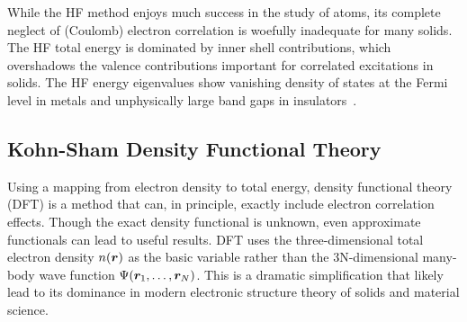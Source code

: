 While the HF method enjoys much success in the study of atoms, its complete neglect of (Coulomb) electron correlation is woefully inadequate for many solids. The HF total energy is dominated by inner shell contributions, which overshadows the valence contributions important for correlated excitations in solids.
The HF energy eigenvalues show vanishing density of states at the Fermi level in metals and unphysically large band gaps in insulators~\cite{Perdew1981}.

\subsection{Kohn-Sham Density Functional Theory}

Using a mapping from electron density to total energy, density functional theory (DFT) is a method that can, in principle, exactly include electron correlation effects.
Though the exact density functional is unknown, even approximate functionals can lead to useful results.
DFT uses the three-dimensional total electron density $n(\boldsymbol{r})$ as the basic variable rather than the 3N-dimensional many-body wave function $\Psi(\boldsymbol{r}_1,\dots,\boldsymbol{r}_N)$. This is a dramatic simplification that likely lead to its dominance in modern electronic structure theory of solids and material science.

